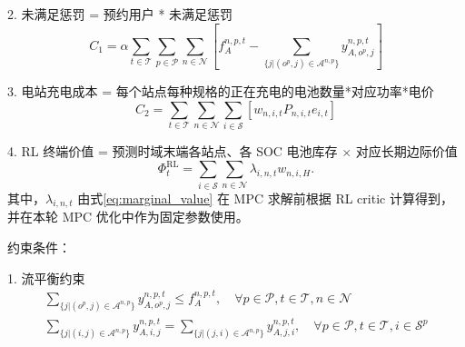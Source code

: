 \documentclass[12pt,hyperref,a4paper,UTF8]{ctexart}
\begin{document}


2. 未满足惩罚 = 预约用户 * 未满足惩罚
\begin{equation}
C_1 = \alpha \sum_{t\in \mathcal{T}} \sum_{p\in \mathcal{P}}  \sum_{n\in \mathcal{N}} 
\left[
f^{n,p,t}_A - \sum_{\{j | (o^p,j) \in \mathcal{A}^{n,p}\}} y^{n,p,t}_{A,o^p,j} \right]
\label{eq:penaltycost}
\end{equation}

3. 电站充电成本 = 每个站点每种规格的正在充电的电池数量*对应功率*电价
\begin{equation}
C_2 = \sum_{t \in \mathcal{T}}  \sum_{n \in \mathcal{N}} \sum_{i \in \mathcal{S}}
\left[
w_{n,i,t}P_{n,i,t}e_{i,t}
\right]
\end{equation}

4. RL 终端价值 = 预测时域末端各站点、各 SOC 电池库存 $\times$ 对应长期边际价值
\begin{equation}
\Phi^{\mathrm{RL}}_t
=
\sum_{i\in\mathcal{S}}\sum_{n\in\mathcal{N}}
\lambda_{i,n,t}w_{n,i,H}.
\label{eq:terminal_objective}
\end{equation}
其中，$\lambda_{i,n,t}$ 由式\eqref{eq:marginal_value} 在 MPC 求解前根据 RL critic 计算得到，并在本轮 MPC 优化中作为固定参数使用。

约束条件：

1. 流平衡约束
\begin{subequations}
\label{eq:flow}
\begin{gather}
\sum_{\{j| (o^p,j)\in \mathcal{A}^{n,p}\}}{y^{n,p,t}_{A,o^p,j}} \leq f^{n,p,t}_A,\quad \forall{p\in \mathcal{P},t\in \mathcal{T}},n \in \mathcal{N}\label{eq:flow1}\\
\sum_{\{j| (i,j)\in \mathcal{A}^{n,p}\}}{y^{n,p,t}_{A,i,j}} =\sum_{\{j| (j,i)\in \mathcal{A}^{n,p}\}}{y^{n,p,t}_{A,j,i}},\quad \forall{p\in \mathcal{P},t\in \mathcal{T},i\in \mathcal{S}^p}\label{eq:flow2}
\end{gather}
\end{subequations}
\end{document}
